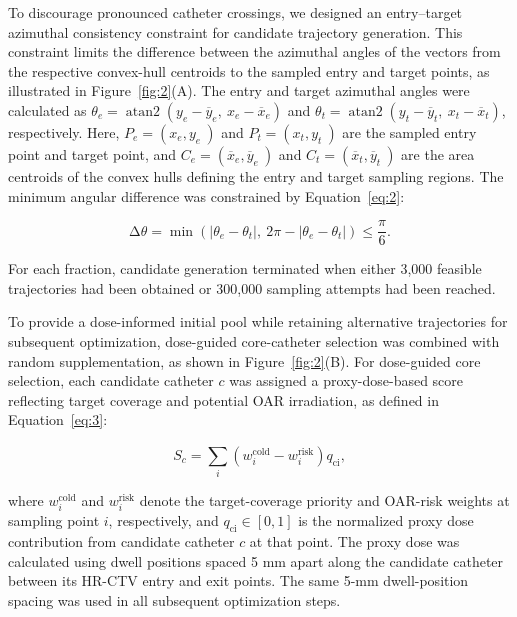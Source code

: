 \documentclass[12pt,twoside,letterpaper]{article}
\begin{document}
To discourage pronounced catheter crossings, we designed an entry--target azimuthal consistency constraint for candidate trajectory generation. This constraint limits the difference between the azimuthal angles of the vectors from the respective convex-hull centroids to the sampled entry and target points, as illustrated in Figure~\ref{fig:2}(A). The entry and target azimuthal angles were calculated as $\theta_{e} = \operatorname{atan2}\left( y_{e} - {\overline{y}}_{e},\ x_{e} - {\overline{x}}_{e} \right)$ and $\theta_{t} = \operatorname{atan2}\left( y_{t} - {\overline{y}}_{t},\ x_{t} - {\overline{x}}_{t} \right)$, respectively. Here, $P_{e} = \left( x_{e},y_{e}\  \right)$ and $P_{t} = \left( x_{t},y_{t}\  \right)$ are the sampled entry point and target point, and $C_{e} = \left( {\overline{x}}_{e},{\overline{y}}_{e}\  \right)$ and $C_{t} = \left( {\overline{x}}_{t},{\overline{y}}_{t}\  \right)$ are the area centroids of the convex hulls defining the entry and target sampling regions. The minimum angular difference was constrained by Equation~\eqref{eq:2}:

\begin{equation}\label{eq:2}
\mathrm{\Delta}\theta = \min\left( \left| \theta_{e} - \theta_{t} \right|,\ 2\pi - \left| \theta_{e} - \theta_{t} \right| \right) \leq \frac{\pi}{6}.
\end{equation}

For each fraction, candidate generation terminated when either 3,000 feasible trajectories had been obtained or 300,000 sampling attempts had been reached.

To provide a dose-informed initial pool while retaining alternative trajectories for subsequent optimization, dose-guided core-catheter selection was combined with random supplementation, as shown in Figure~\ref{fig:2}(B). For dose-guided core selection, each candidate catheter $c$ was assigned a proxy-dose-based score reflecting target coverage and potential OAR irradiation, as defined in Equation~\eqref{eq:3}:

\begin{equation}\label{eq:3}
S_{c} = \sum_{i}^{}(w_{i}^{\text{cold}} - w_{i}^{\text{risk}})q_{\text{ci}},
\end{equation}

where $w_{i}^{\text{cold}}$ and $w_{i}^{\text{risk}}$ denote the target-coverage priority and OAR-risk weights at sampling point $i$, respectively, and $q_{\text{ci}} \in \left\lbrack 0,1 \right\rbrack$ is the normalized proxy dose contribution from candidate catheter $c$ at that point. The proxy dose was calculated using dwell positions spaced 5 mm apart along the candidate catheter between its HR-CTV entry and exit points. The same 5-mm dwell-position spacing was used in all subsequent optimization steps.
\end{document}
